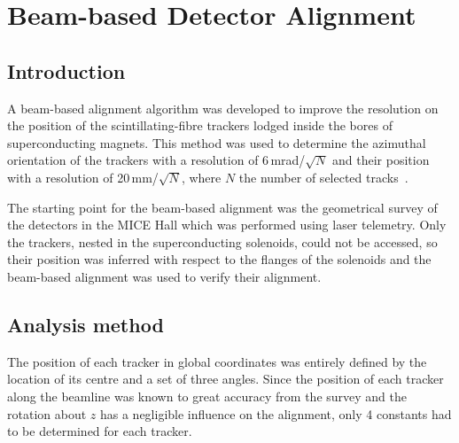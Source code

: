 \graphicspath{{09-Detector-alignment/Figures/}}

\section{Beam-based Detector Alignment}
\label{Sect:DA}

\subsection{Introduction}
\label{SubSect:DA_Intro}

A beam-based alignment algorithm was developed to improve the resolution on the position of the scintillating-fibre trackers lodged inside the bores of superconducting magnets. This method was used to determine the azimuthal orientation of the trackers with a resolution of 6\,mrad/$\sqrt{N}$ and their position with a resolution of 20\,mm/$\sqrt{N}$, where $N$ the number of selected tracks~\cite{2018arXiv1805.06623T}.


The starting point for the beam-based alignment was the geometrical survey of the detectors in the MICE Hall which was performed using laser telemetry.
Only the trackers, nested in the superconducting solenoids, could not be accessed, so their position was inferred with respect to the flanges of the solenoids and the beam-based alignment was used to verify their alignment.

\subsection{Analysis method}
\label{SubSect:DA_Analysis}

The position of each tracker in global coordinates was entirely defined by the location of its centre and a set of three angles.
Since the position of each tracker along the beamline was known to great accuracy from the survey and the rotation about $z$ has a negligible influence on the alignment, only 4 constants had to be determined for each tracker.

